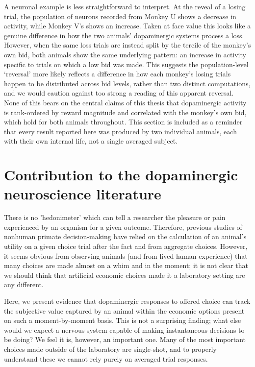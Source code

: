 A neuronal example is less straightforward to interpret. At the reveal of a losing trial, the population of neurons recorded from Monkey U shows a decrease in activity, while Monkey V's shows an increase. Taken at face value this looks like a genuine difference in how the two animals' dopaminergic systems process a loss. However, when the same loss trials are instead split by the tercile of the monkey's own bid, both animals show the same underlying pattern: an increase in activity specific to trials on which a low bid was made. This suggests the population-level `reversal' more likely reflects a difference in how each monkey's losing trials happen to be distributed across bid levels, rather than two distinct computations, and we would caution against too strong a reading of this apparent reversal. None of this bears on the central claims of this thesis that dopaminergic activity is rank-ordered by reward magnitude and correlated with the monkey's own bid, which hold for both animals throughout. This section is included as a reminder that every result reported here was produced by two individual animals, each with their own internal life, not a single averaged subject.

\clearpage
\section{Contribution to the dopaminergic neuroscience literature}

There is no 'hedonimeter' which can tell a researcher the pleasure or pain experienced by an organism for a given outcome. Therefore, previous studies of nonhuman primate decision-making have relied on the calculation of an animal's utility on a given choice trial after the fact and from aggregate choices. However, it seems obvious from observing animals (and from lived human experience) that many choices are made almost on a whim and in the moment; it is not clear that we should think that artificial economic choices made it a laboratory setting are any different.

Here, we present evidence that dopaminergic responses to offered choice can track the subjective value captured by an animal within the economic options present on such a moment-by-moment basis. This is not a surprising finding; what else would we expect a nervous system capable of making instantaneous decisions to be doing? We feel it is, however, an important one. Many of the most important choices made outside of the laboratory are single-shot, and to properly understand these we cannot rely purely on averaged trial responses.

